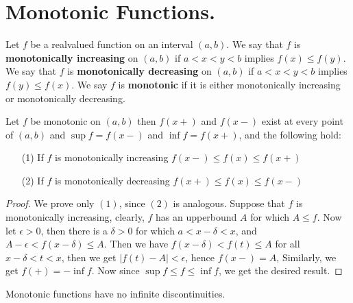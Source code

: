
\section{Monotonic Functions.}

\begin{definition}
    Let $f$ be a realvalued function on an interval  $(a,b)$. We say that  $f$ is
    \textbf{monotonically increasing} on $(a,b)$ if  $a<x<y<b$ implies  $f(x) \leq f(y)$.
    We say that  $f$ is \textbf{monotonically decreasing} on $(a,b)$ if  $a<x<y<b$
    implies  $f(y) \leq f(x)$. We say $f$ is \textbf{monotonic} if it is either monotonically
    increasing or monotonically decreasing.
\end{definition}

\begin{theorem}\label{5.6.1}
    Let $f$ be monotonic on $(a,b)$ then $f(x+)$ and  $f(x-)$ exist at every point of
    $(a,b)$ and $\sup{f}=f(x-)$ and  $\inf{f}=f(x+)$, and the following hold:
        \begin{enumerate}
            \item[(1)] If $f$ is monotonically increasing $f(x-) \leq f(x) \leq f(x+)$

            \item[(2)] If $f$ is monotonically decreasing $f(x+) \leq f(x) \leq f(x-)$
        \end{enumerate}
\end{theorem}
\begin{proof}
    We prove only $(1)$, since  $(2)$ is analogous. Suppose that $f$ is monotonically
    increasing, clearly,  $f$ has an upperbound  $A$ for which  $A \leq f$. Now let  $\epsilon>0$,
    then there is a  $\delta>0$ for which  $a<x-\delta<x$, and  $A-\epsilon<f(x-\delta) \leq A$.  Then we have
    $f(x-\delta)<f(t) \leq A$ for all  $x-\delta<t<x$, then we get  $|f(t)-A|<\epsilon$, hence
    $f(x-)=A$, Similarly, we get  $f(+)=-\inf{f}$. Now since  $\sup{f} \leq f \leq \inf{f}$,
    we get the desired result.
\end{proof}

\begin{corollary}
    Monotonic functions have no infinite discontinuities.
\end{corollary}

